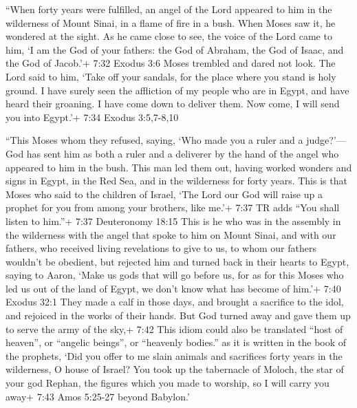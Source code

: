  ``When forty years were fulfilled, an angel of the Lord
appeared to him in the wilderness of Mount Sinai, in a flame of fire in
a bush.  When Moses saw it, he wondered at the sight. As he
came close to see, the voice of the Lord came to him,  `I
am the God of your fathers: the God of Abraham, the God of Isaac, and
the God of Jacob.'+ 7:32 Exodus 3:6 Moses trembled and dared not look.
 The Lord said to him, `Take off your sandals, for the
place where you stand is holy ground.  I have surely seen
the affliction of my people who are in Egypt, and have heard their
groaning. I have come down to deliver them. Now come, I will send you
into Egypt.'+ 7:34 Exodus 3:5,7-8,10

 ``This Moses whom they refused, saying, `Who made you a
ruler and a judge?'---God has sent him as both a ruler and a deliverer
by the hand of the angel who appeared to him in the bush. 
This man led them out, having worked wonders and signs in Egypt, in the
Red Sea, and in the wilderness for forty years.  This is
that Moses who said to the children of Israel, `The Lord our God will
raise up a prophet for you from among your brothers, like me.'+ 7:37 TR
adds ``You shall listen to him.''+ 7:37 Deuteronomy 18:15 
This is he who was in the assembly in the wilderness with the angel that
spoke to him on Mount Sinai, and with our fathers, who received living
revelations to give to us,  to whom our fathers wouldn't be
obedient, but rejected him and turned back in their hearts to Egypt,
 saying to Aaron, `Make us gods that will go before us, for
as for this Moses who led us out of the land of Egypt, we don't know
what has become of him.'+ 7:40 Exodus 32:1  They made a
calf in those days, and brought a sacrifice to the idol, and rejoiced in
the works of their hands.  But God turned away and gave
them up to serve the army of the sky,+ 7:42 This idiom could also be
translated ``host of heaven'', or ``angelic beings'', or ``heavenly
bodies.'' as it is written in the book of the prophets, `Did you offer
to me slain animals and sacrifices forty years in the wilderness, O
house of Israel?  You took up the tabernacle of Moloch, the
star of your god Rephan, the figures which you made to worship, so I
will carry you away+ 7:43 Amos 5:25-27 beyond Babylon.'

